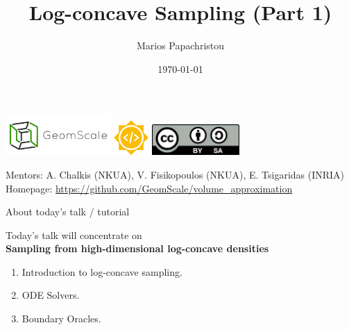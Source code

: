 \documentclass[10pt]{beamer}
\title{Log-concave Sampling (Part 1)}
\author{Marios Papachristou}
\institute{GeomScale, NTUA}
\date{\today}
\begin{document}
\begin{frame}
    \titlepage
    \begin{center}
        \includegraphics[width=0.3\textwidth]{publications/presentations/log_concave_sampling/logo.png} \quad 
        \includegraphics[width=0.1\textwidth]{publications/presentations/log_concave_sampling/gsoc.png} \quad
        \includegraphics[width=0.25\textwidth]{publications/presentations/log_concave_sampling/cc.png}
    \end{center}
    
    \small {
    Mentors: A. Chalkis (NKUA), V. Fisikopoulos (NKUA), E. Tsigaridas (INRIA) \\
    Homepage: \url{https://github.com/GeomScale/volume_approximation} 
    }
\end{frame}


\begin{frame}{About today's talk / tutorial}

Today's talk will concentrate on 
\\
\textbf{Sampling from high-dimensional log-concave densities}

\begin{enumerate}
    \item Introduction to log-concave sampling.
    \item ODE Solvers.
    \item Boundary Oracles.
\end{enumerate}


\end{frame}
\end{document}
